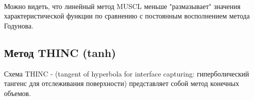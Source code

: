 \documentclass[12pt,a4paper]{article}
\begin{document}
\medskip
\\
Можно видеть, что линейный метод MUSCL меньше "размазывает" значения характеристической функции по сравнению с постоянным восполнением метода Годунова.

\subsection{Метод THINC (tanh)}
Схема THINC - (tangent of hyperbola for interface capturing: гиперболический тангенс для отслеживания поверхности) представляет собой метод конечных объемов.
\end{document}
